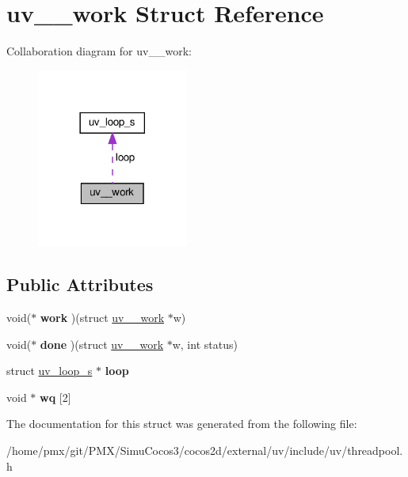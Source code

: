 \hypertarget{structuv____work}{}\section{uv\+\_\+\+\_\+work Struct Reference}
\label{structuv____work}


Collaboration diagram for uv\+\_\+\+\_\+work\+:
\nopagebreak
\begin{figure}[H]
\begin{center}
\leavevmode
\includegraphics[width=141pt]{structuv____work__coll__graph}
\end{center}
\end{figure}
\subsection*{Public Attributes}
\begin{DoxyCompactItemize}
\item 
\mbox{\label{structuv____work_ae15a4e35dbd9a3172961df99b2c931a8}} 
void($\ast$ {\bfseries work} )(struct \hyperlink{structuv____work}{uv\+\_\+\+\_\+work} $\ast$w)
\item 
\mbox{\label{structuv____work_ad7ea3cfc241af50786d5c5822c1bfe53}} 
void($\ast$ {\bfseries done} )(struct \hyperlink{structuv____work}{uv\+\_\+\+\_\+work} $\ast$w, int status)
\item 
\mbox{\label{structuv____work_a902db58d27271a1c0baa31f2a499fc00}} 
struct \hyperlink{structuv__loop__s}{uv\+\_\+loop\+\_\+s} $\ast$ {\bfseries loop}
\item 
\mbox{\label{structuv____work_a2c6eda71852844b5bf702340a76ca8e6}} 
void $\ast$ {\bfseries wq} \mbox{[}2\mbox{]}
\end{DoxyCompactItemize}


The documentation for this struct was generated from the following file\+:\begin{DoxyCompactItemize}
\item 
/home/pmx/git/\+P\+M\+X/\+Simu\+Cocos3/cocos2d/external/uv/include/uv/threadpool.\+h\end{DoxyCompactItemize}
